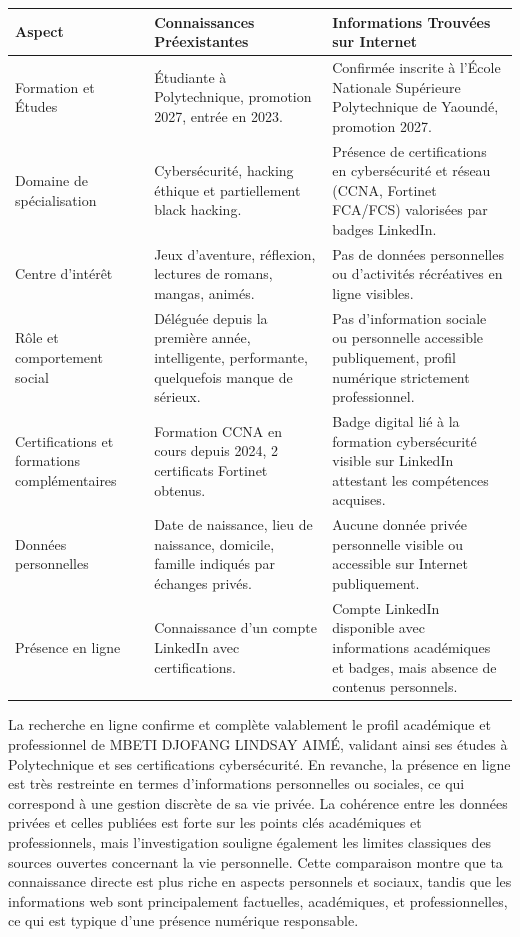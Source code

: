 \documentclass[12pt, a4paper]{article}
\begin{document}
	\begin{center}
		\begin{tabular}{|p{3cm}|p{5cm}|p{5cm}|}
			\hline
			\textbf{Aspect} & \textbf{Connaissances Préexistantes} & \textbf{Informations Trouvées sur Internet} \\
			\hline
			Formation et Études & Étudiante à Polytechnique, promotion 2027, entrée en 2023. & Confirmée inscrite à l'École Nationale Supérieure Polytechnique de Yaoundé, promotion 2027. \\
			\hline
			Domaine de spécialisation & Cybersécurité, hacking éthique et partiellement black hacking. & Présence de certifications en cybersécurité et réseau (CCNA, Fortinet FCA/FCS) valorisées par badges LinkedIn. \\
			\hline
			Centre d'intérêt & Jeux d'aventure, réflexion, lectures de romans, mangas, animés. & Pas de données personnelles ou d'activités récréatives en ligne visibles. \\
			\hline
			Rôle et comportement social & Déléguée depuis la première année, intelligente, performante, quelquefois manque de sérieux. & Pas d'information sociale ou personnelle accessible publiquement, profil numérique strictement professionnel. \\
			\hline
			Certifications et formations complémentaires & Formation CCNA en cours depuis 2024, 2 certificats Fortinet obtenus. & Badge digital lié à la formation cybersécurité visible sur LinkedIn attestant les compétences acquises. \\
			\hline
			Données personnelles & Date de naissance, lieu de naissance, domicile, famille indiqués par échanges privés. & Aucune donnée privée personnelle visible ou accessible sur Internet publiquement. \\
			\hline
			Présence en ligne & Connaissance d'un compte LinkedIn avec certifications. & Compte LinkedIn disponible avec informations académiques et badges, mais absence de contenus personnels. \\
			\hline
		\end{tabular}
	\end{center}
	
	La recherche en ligne confirme et complète valablement le profil académique et professionnel de MBETI DJOFANG LINDSAY AIMÉ, validant ainsi ses études à Polytechnique et ses certifications cybersécurité. En revanche, la présence en ligne est très restreinte en termes d'informations personnelles ou sociales, ce qui correspond à une gestion discrète de sa vie privée. La cohérence entre les données privées et celles publiées est forte sur les points clés académiques et professionnels, mais l'investigation souligne également les limites classiques des sources ouvertes concernant la vie personnelle. Cette comparaison montre que ta connaissance directe est plus riche en aspects personnels et sociaux, tandis que les informations web sont principalement factuelles, académiques, et professionnelles, ce qui est typique d'une présence numérique responsable.
	
\end{document}
